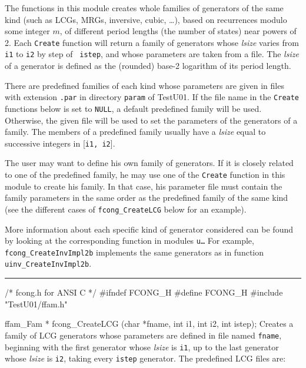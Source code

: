 
The functions in this module creates whole families of generators of the same
kind (such as LCGs, MRGs, inversive, cubic, \ldots), based on recurrences
modulo some integer $m$, of different period lengths (the number of states) 
near powers of 2.
Each {\tt Create} function will return a family of generators whose
{\it lsize\/} varies from {\tt i1} to  {\tt i2} by step of {\tt
istep}, and whose parameters are taken from a file.
The {\it lsize\/} of a generator is defined as the (rounded) base-2 
logarithm of its period length.

 There are predefined families of each
kind whose parameters are given in files with extension {\tt .par} in
directory {\tt param} of TestU01.
 If the file name in the {\tt Create} functions
below is set to {\tt NULL}, a default predefined family
will be used. Otherwise, the given file will be used to set the parameters
of the generators of a family.
The members of a predefined family usually have a  {\it lsize\/} equal
to successive integers in [{\tt i1, i2}].
%

The user may want to define his own family of generators. If it is closely
related to one of the predefined family, he may use one of the {\tt Create}
function in this module to create his family. In that case, his
parameter file must contain the family parameters in the same order as the
predefined family of the same kind
(see the different cases of {\tt fcong\_CreateLCG} below for an example).

More information about each specific kind of generator considered can
be found by looking at the corresponding function in modules {\tt u\ldots}
For example, {\tt fcong\_CreateInvImpl2b} implements the same generators
as in function {\tt uinv\_CreateInvImpl2b}.
 

\bigskip
\hrule
\code\hide
/* fcong.h  for ANSI C */
#ifndef FCONG_H
#define FCONG_H
\endhide
#include "TestU01/ffam.h"
\endcode



\code

ffam_Fam * fcong_CreateLCG (char *fname, int i1, int i2, int istep);
\endcode
\tab
 Creates a family of LCG generators whose parameters
 are defined in file named {\tt fname}, beginning with the first
 generator whose {\it lsize\/} is {\tt i1}, up to the last generator whose
 {\it lsize\/} is {\tt i2}, taking every {\tt istep} generator.
 The predefined LCG files are:

